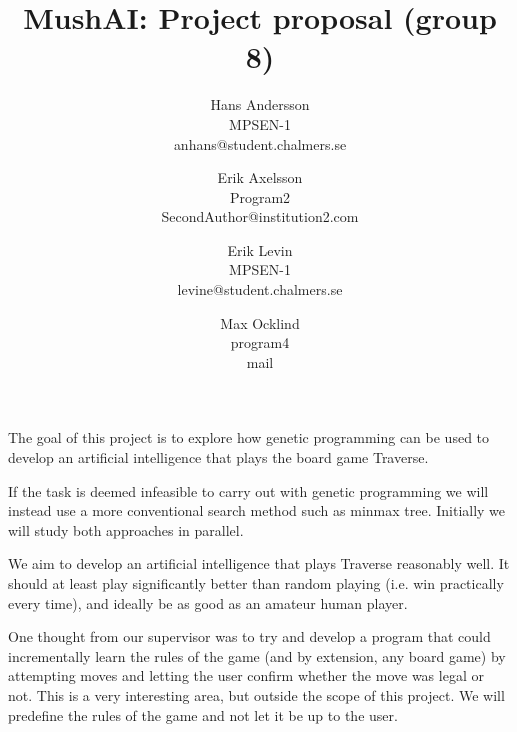 \documentclass[times, 10pt,twocolumn]{article}
\begin{document}
\title{MushAI: Project proposal (group 8)}

\author{Hans Andersson\\
MPSEN-1\\anhans@student.chalmers.se\\
\and
Erik Axelsson\\
Program2\\
SecondAuthor@institution2.com\\
\and
Erik Levin\\
MPSEN-1\\
levine@student.chalmers.se
\and
Max Ocklind\\
program4\\
mail
}

\maketitle
\thispagestyle{empty}



The goal of this project is to explore how genetic programming can be used to develop an artificial intelligence that plays the board game Traverse.

If the task is deemed infeasible to carry out with genetic programming we will instead use a more conventional search method such as minmax tree. Initially we will study both approaches in parallel.



We aim to develop an artificial intelligence that plays Traverse reasonably well. It should at least play significantly better than random playing (i.e. win practically every time), and ideally be as good as an amateur human player.


One thought from our supervisor was to try and develop a program that could incrementally learn the rules of the game (and by extension, any board game) by attempting moves and letting the user confirm whether the move was legal or not. This is a very interesting area, but outside the scope of this project. We will predefine the rules of the game and not let it be up to the user.
\end{document}
